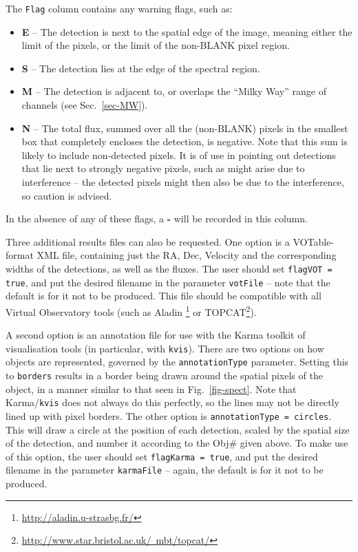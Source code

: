 The \texttt{Flag} column contains any warning flags, such as:
\begin{itemize}
\item \textbf{E} -- The detection is next to the spatial edge of the image,
meaning either the limit of the pixels, or the limit of the non-BLANK
pixel region.
\item \textbf{S} -- The detection lies at the edge of the spectral region.
\item \textbf{M} -- The detection is adjacent to, or overlaps the
  ``Milky Way'' range of channels (see Sec.~\ref{sec-MW}).
\item \textbf{N} -- The total flux, summed over all the (non-BLANK)
pixels in the smallest box that completely encloses the detection, is
negative. Note that this sum is likely to include non-detected
pixels. It is of use in pointing out detections that lie next to
strongly negative pixels, such as might arise due to interference --
the detected pixels might then also be due to the interference, so
caution is advised.
\end{itemize}
In the absence of any of these flags, a \textbf{-} will be recorded in
this column.


Three additional results files can also be requested. One option is a
VOTable-format XML file, containing just the RA, Dec, Velocity and the
corresponding widths of the detections, as well as the fluxes. The
user should set \texttt{flagVOT = true}, and put the desired filename
in the parameter \texttt{votFile} -- note that the default is for it
not to be produced. This file should be compatible with all Virtual
Observatory tools (such as Aladin%
\footnote{%
\href{http://aladin.u-strasbg.fr/}{http://aladin.u-strasbg.fr/}}
or TOPCAT\footnote{%
\href{http://www.star.bristol.ac.uk/~mbt/topcat/}%
{http://www.star.bristol.ac.uk/~mbt/topcat/}}). 

A second option is an annotation file for use with the Karma toolkit
of visualisation tools (in particular, with \texttt{kvis}). There are
two options on how objects are represented, governed by the
\texttt{annotationType} parameter. Setting this to \texttt{borders}
results in a border being drawn around the spatial pixels of the
object, in a manner similar to that seen in Fig.~\ref{fig-spect}. Note
that Karma/\texttt{kvis} does not always do this perfectly, so the
lines may not be directly lined up with pixel borders. The other
option is \texttt{annotationType = circles}. This will draw a circle
at the position of each detection, scaled by the spatial size of the
detection, and number it according to the Obj\# given above. To make
use of this option, the user should set \texttt{flagKarma = true}, and
put the desired filename in the parameter \texttt{karmaFile} -- again,
the default is for it not to be produced.

